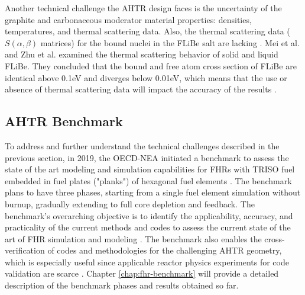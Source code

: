 Another technical challenge the \gls{AHTR} design faces is the uncertainty of 
the graphite and carbonaceous moderator material properties: densities, 
temperatures, and thermal scattering data.
Also, the thermal scattering data ($S(\alpha,\beta)$ matrices) for the bound 
nuclei in the \gls{FLiBe} salt are lacking \cite{ramey_monte_2018}. 
Mei et al. \cite{mei_investigation_2013} and Zhu et al. \cite{zhu_thermal_2017} 
examined the thermal scattering behavior of solid and liquid \gls{FLiBe}.
They concluded that the bound and free atom cross section of \gls{FLiBe} are 
identical above 0.1eV and diverges below 0.01eV, which means that the use or 
absence of thermal scattering data will impact the accuracy of the results 
\cite{ramey_monte_2018}. 

\subsection{AHTR Benchmark}
To address and further understand the technical challenges described 
in the previous section, in 2019, the OECD-NEA initiated a benchmark to assess the 
state of the art modeling and simulation capabilities for \glspl{FHR} with 
\gls{TRISO} fuel embedded in fuel plates ("planks") of hexagonal fuel elements
\cite{noauthor_fluoride_nodate}. 
The benchmark plans to have three phases, starting from a single fuel element 
simulation without burnup, gradually extending to full core depletion and feedback. 
The benchmark's overarching objective is to identify the applicability, accuracy, 
and practicality of the current methods and codes to assess the current state 
of the art of FHR simulation and modeling \cite{petrovic_preliminary_2021}. 
The benchmark also enables the cross-verification of codes and methodologies 
for the challenging \gls{AHTR} geometry, which is especially useful since 
applicable reactor physics experiments for code validation are scarce 
\cite{petrovic_fhrahtr_2019,petrovic_preliminary_2021}. 
Chapter \ref{chap:fhr-benchmark} will provide a detailed description of the 
benchmark phases and results obtained so far.

